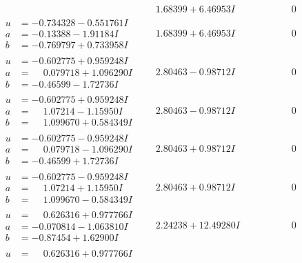 \documentclass[1p]{elsarticle_modified}
\theoremstyle{definition}
\begin{document}
$$\begin{array}{c|c|c}
 & \phantom{-}1.68399 + 6.46953 I & \phantom{-0.000000 } 0 \\ \hline\begin{aligned}
u &= -0.734328 - 0.551761 I \\
a &= -0.13388 - 1.91184 I \\
b &= -0.769797 + 0.733958 I\end{aligned}
 & \phantom{-}1.68399 + 6.46953 I & \phantom{-0.000000 } 0 \\ \hline\begin{aligned}
u &= -0.602775 + 0.959248 I \\
a &= \phantom{-}0.079718 + 1.096290 I \\
b &= -0.46599 - 1.72736 I\end{aligned}
 & \phantom{-}2.80463 - 0.98712 I & \phantom{-0.000000 } 0 \\ \hline\begin{aligned}
u &= -0.602775 + 0.959248 I \\
a &= \phantom{-}1.07214 - 1.15950 I \\
b &= \phantom{-}1.099670 + 0.584349 I\end{aligned}
 & \phantom{-}2.80463 - 0.98712 I & \phantom{-0.000000 } 0 \\ \hline\begin{aligned}
u &= -0.602775 - 0.959248 I \\
a &= \phantom{-}0.079718 - 1.096290 I \\
b &= -0.46599 + 1.72736 I\end{aligned}
 & \phantom{-}2.80463 + 0.98712 I & \phantom{-0.000000 } 0 \\ \hline\begin{aligned}
u &= -0.602775 - 0.959248 I \\
a &= \phantom{-}1.07214 + 1.15950 I \\
b &= \phantom{-}1.099670 - 0.584349 I\end{aligned}
 & \phantom{-}2.80463 + 0.98712 I & \phantom{-0.000000 } 0 \\ \hline\begin{aligned}
u &= \phantom{-}0.626316 + 0.977766 I \\
a &= -0.070814 - 1.063810 I \\
b &= -0.87454 + 1.62900 I\end{aligned}
 & \phantom{-}2.24238 + 12.49280 I & \phantom{-0.000000 } 0 \\ \hline\begin{aligned}
u &= \phantom{-}0.626316 + 0.977766 I \\

\end{aligned}
\end{array}$$
\end{document}
